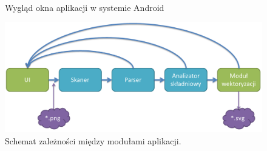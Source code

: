 \documentclass[11pt,a4paper]{article}
\begin{document}
\begin{figure}
\centering
\mbox{
\quad
{}
}
\caption{Wygląd okna aplikacji w systemie Android}\label{android} 
\end{figure}
\begin{figure}
\includegraphics[width=\textwidth]{schemat.png}
\caption{Schemat zależności między modułami aplikacji.}
\label{schemat}
\end{figure}
\end{document}
